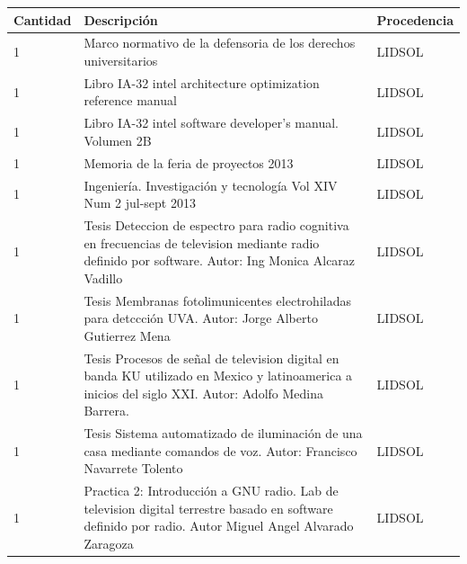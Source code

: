 \documentclass[a4paper,11pt]{article}                 %
\begin{document}
\begin{longtable}{|p{}|p{}|p{}|}
\hline
Cantidad & Descripción                                                                                                                                               & Procedencia \\ \hline
1        & Marco normativo de la defensoria de los derechos universitarios                                                                                        & LIDSOL      \\ \hline
1        & Libro IA-32 intel architecture optimization reference manual                                                                                           & LIDSOL      \\ \hline
1        & Libro IA-32 intel software developer's manual. Volumen 2B                                                                                              & LIDSOL      \\ \hline
1        & Memoria de la feria de proyectos 2013                                                                                                                  & LIDSOL      \\ \hline
1        & Ingeniería. Investigación y tecnología Vol XIV Num 2 jul-sept 2013                                                                                     & LIDSOL      \\ \hline
1        & Tesis Deteccion de espectro para radio cognitiva en frecuencias de television mediante radio definido por software.  Autor: Ing Monica Alcaraz Vadillo & LIDSOL      \\ \hline
1        & Tesis Membranas fotolimunicentes electrohiladas para detccción UVA. Autor: Jorge Alberto Gutierrez Mena                                                & LIDSOL      \\ \hline
1        & Tesis Procesos de señal de television digital en banda KU utilizado en Mexico y latinoamerica a inicios del siglo XXI. Autor: Adolfo Medina Barrera.   & LIDSOL      \\ \hline
1        & Tesis Sistema automatizado de iluminación de una casa mediante comandos de voz. Autor: Francisco Navarrete Tolento                                     & LIDSOL      \\ \hline
1        & Practica 2: Introducción a GNU radio. Lab de television digital terrestre basado en software definido por radio. Autor Miguel Angel Alvarado Zaragoza  & LIDSOL      \\ \hline

\end{longtable}
\end{document}
